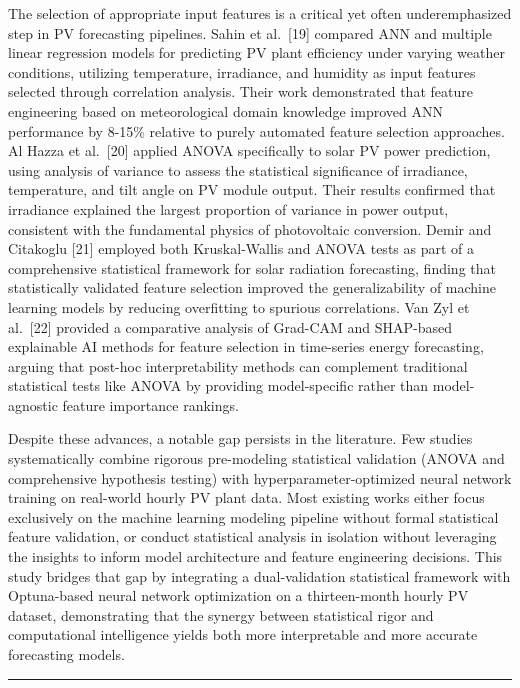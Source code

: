 \documentclass[
  11pt,
]{article}
\begin{document}
The selection of appropriate input features is a critical yet often
underemphasized step in PV forecasting pipelines. Sahin et al.~{[}19{]}
compared ANN and multiple linear regression models for predicting PV
plant efficiency under varying weather conditions, utilizing
temperature, irradiance, and humidity as input features selected through
correlation analysis. Their work demonstrated that feature engineering
based on meteorological domain knowledge improved ANN performance by
8-15\% relative to purely automated feature selection approaches. Al
Hazza et al.~{[}20{]} applied ANOVA specifically to solar PV power
prediction, using analysis of variance to assess the statistical
significance of irradiance, temperature, and tilt angle on PV module
output. Their results confirmed that irradiance explained the largest
proportion of variance in power output, consistent with the fundamental
physics of photovoltaic conversion. Demir and Citakoglu {[}21{]}
employed both Kruskal-Wallis and ANOVA tests as part of a comprehensive
statistical framework for solar radiation forecasting, finding that
statistically validated feature selection improved the generalizability
of machine learning models by reducing overfitting to spurious
correlations. Van Zyl et al.~{[}22{]} provided a comparative analysis of
Grad-CAM and SHAP-based explainable AI methods for feature selection in
time-series energy forecasting, arguing that post-hoc interpretability
methods can complement traditional statistical tests like ANOVA by
providing model-specific rather than model-agnostic feature importance
rankings.

Despite these advances, a notable gap persists in the literature. Few
studies systematically combine rigorous pre-modeling statistical
validation (ANOVA and comprehensive hypothesis testing) with
hyperparameter-optimized neural network training on real-world hourly PV
plant data. Most existing works either focus exclusively on the machine
learning modeling pipeline without formal statistical feature
validation, or conduct statistical analysis in isolation without
leveraging the insights to inform model architecture and feature
engineering decisions. This study bridges that gap by integrating a
dual-validation statistical framework with Optuna-based neural network
optimization on a thirteen-month hourly PV dataset, demonstrating that
the synergy between statistical rigor and computational intelligence
yields both more interpretable and more accurate forecasting models.

\begin{center}\rule{0.5\linewidth}{0.5pt}\end{center}
\end{document}
